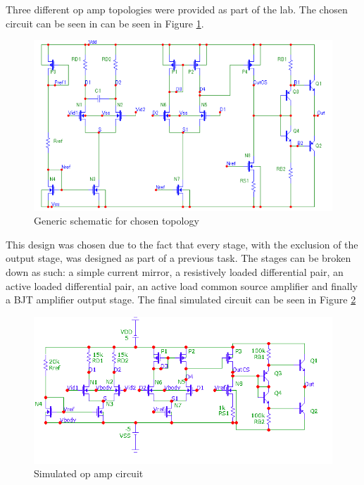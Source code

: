 



Three different op amp topologies were provided as part of the lab. The chosen circuit can be seen in can be seen in Figure \ref{fig:default}.

\begin{figure}[H]
    \begin{center}
    \includegraphics[scale=.85]{Simulations/default_circ.png}
    \caption{Generic schematic for chosen topology \cite{b2}}
    \label{fig:default}
    \end{center}
\end{figure}
This design was chosen due to the fact that every stage, with the exclusion of the output stage, was designed as part of a previous task. The stages can be broken down as such: a simple current mirror, a resistively loaded differential pair, an active loaded differential pair, an active load common source amplifier and finally a BJT amplifier output stage. The final simulated circuit can be seen in Figure \ref{fig:simcircuit}

\begin{figure}[H]
    \begin{center}
    \includegraphics[scale=.85]{Simulations/simcircuit.png}
    \caption{Simulated op amp circuit}
    \label{fig:simcircuit}
    \end{center}
\end{figure}

